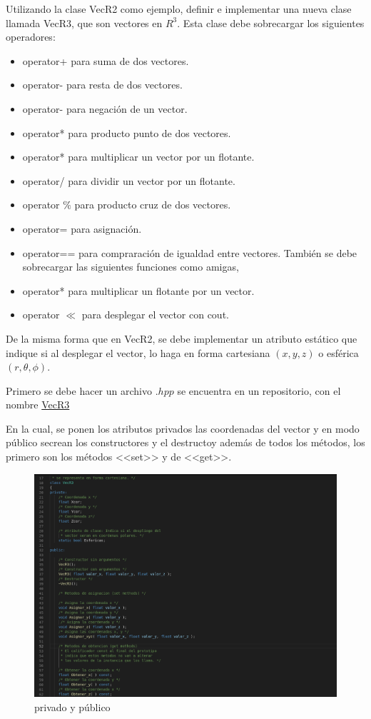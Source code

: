 \documentclass[11pt]{article}
\begin{document}
\begin{problem}
	Utilizando la clase VecR2 como ejemplo, definir e implementar una	nueva clase llamada VecR3, que son vectores en $R^3$. Esta clase debe sobrecargar los siguientes operadores:
	
	\begin{itemize}
		\item operator+ para suma de dos vectores.
		\item  operator- para resta de dos vectores.
		\item operator- para negación de un vector.
		\item operator* para producto punto de dos vectores.
		\item operator* para multiplicar un vector por un flotante.
		\item operator/ para dividir un vector por un flotante.
		\item operator $\%$ para producto cruz de dos vectores.
		\item operator= para asignación.
		\item operator== para compraración de igualdad entre vectores.
		También se debe sobrecargar las siguientes funciones como amigas,		
		\item operator* para multiplicar un flotante por un vector.
		\item operator $\ll$ para desplegar el vector con cout.
		
 	\end{itemize}
		De la misma forma que en VecR2, se debe implementar un atributo estático que indique si al desplegar el vector, lo haga en forma cartesiana $(x, y, z)$ o esférica $(r, \theta, \phi )$.
\end{problem}

	Primero se debe hacer un archivo $ .hpp $ se encuentra en un repositorio, con el nombre \href{https://github.com/Mohs9/Lab-Avanzado/blob/eee254f75da3f1da0648a65ce5d045611bca5708/Tareas/T1_II_3/VecR3.hpp}{VecR3}
	
	
	En la cual, se ponen los atributos privados las coordenadas del vector y en modo público secrean los constructores y el destructoy además de todos los métodos, los primero son los métodos <<set>> y de <<get>>. 
	
	\begin{figure}[H]
		\centering
		\includegraphics[width=0.7\linewidth]{img1}
		\caption{privado y público}
	\end{figure}
	
\end{document}
